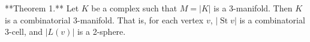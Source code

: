 **Theorem 1.** Let $K$ be a complex such that $M = |K|$ is a 3-manifold. Then $K$ is a combinatorial 3-manifold. That is, for each vertex $v$, $|\operatorname{St} v|$ is a combinatorial 3-cell, and $|L(v)|$ is a 2-sphere.
